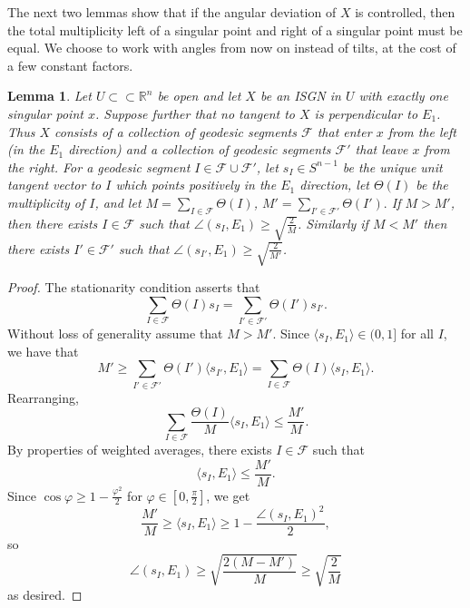 \documentclass[10pt,a4paper]{amsart}
\newtheorem{lemma}{Lemma}
\begin{document}
The next two lemmas show that if the angular deviation of $X$ is controlled, then the total multiplicity left of a singular point and right of a singular point must be equal. We choose to work with angles from now on instead of tilts, at the cost of a few constant factors.

\begin{lemma} \label{two-sides}
Let $U \subset\subset \mathbb{R}^n$ be open and let $X$ be an ISGN in $U$ with exactly one singular point $x$. Suppose further that no tangent to $X$ is perpendicular to $E_1$. Thus $X$ consists of a collection of geodesic segments $\mathcal{F}$ that enter $x$ from the left (in the $E_1$ direction) and a collection of geodesic segments $\mathcal{F}'$ that leave $x$ from the right. For a geodesic segment $I \in \mathcal{F} \cup \mathcal{F}'$, let $s_I \in S^{n-1}$ be the unique unit tangent vector to $I$ which points positively in the $E_1$ direction, let $\Theta(I)$ be the multiplicity of $I$, and let $M = \sum_{I \in \mathcal{F}} \Theta(I)$, $M' = \sum_{I' \in \mathcal{F}'} \Theta(I').$ If $M > M'$, then there exists $I \in \mathcal{F}$ such that $\angle(s_I,E_1) \geq \sqrt{\frac{2}{M}}$. Similarly if $M < M'$ then there exists $I' \in \mathcal{F}'$ such that $\angle(s_{I'},E_1) \geq \sqrt{\frac{2}{M'}}$.
    
\end{lemma}

\begin{proof}
   The stationarity condition asserts that
\[\sum_{I \in \mathcal{F}} \Theta(I) s_I = \sum_{I' \in \mathcal{F}'} \Theta(I') s_{I'}.\]
Without loss of generality assume that $M > M'$. Since $\langle s_{I},E_1\rangle \in (0,1]$ for all $I$, we have that
\[M' \geq \sum_{I' \in \mathcal{F}'} \Theta (I') \langle s_{I'} ,E_1\rangle = \sum_{I \in \mathcal{F}} \Theta(I)\langle s_{I},E_1\rangle.\]
Rearranging,
\[\sum_{I \in \mathcal{F}} \frac{\Theta(I)}{M}\langle s_{I},E_1\rangle \leq \frac{M'}{M}.\]
By properties of weighted averages, there exists $I \in \mathcal{F}$ such that
\[\langle s_I,E_1\rangle \leq \frac{M'}{M}.\]
Since $\cos \varphi \geq 1-\frac{\varphi^2}{2}$ for $\varphi \in [0,\frac{\pi}{2}]$, we get 
\[\frac{M'}{M} \geq \langle s_I,E_1\rangle \geq 1 - \frac{\angle(s_I,E_1)^2}{2},\]
so
\[\angle(s_I,E_1) \geq \sqrt{\frac{2(M-M')}{M}} \geq \sqrt{\frac{2}{M}}\]
as desired.
\end{proof}
\end{document}
